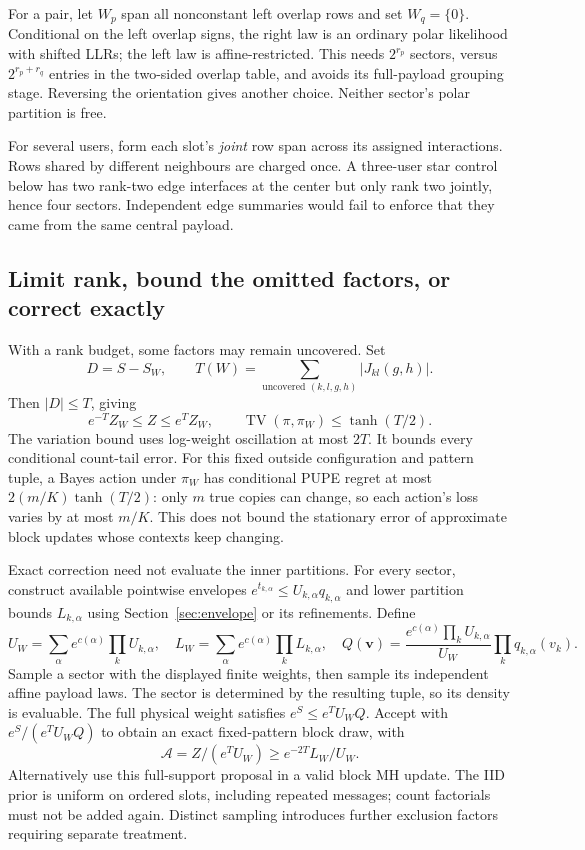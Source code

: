 \documentclass[10pt,a4paper]{article}
\newcommand{\TV}{\operatorname{TV}}
\begin{document}
For a pair, let $W_p$ span all nonconstant left overlap rows and set $W_q=\{0\}$. Conditional on the
left overlap signs, the right law is an ordinary polar likelihood with shifted LLRs; the left law
is affine-restricted. This needs $2^{r_p}$ sectors, versus $2^{r_p+r_q}$ entries in the two-sided
overlap table, and avoids its full-payload grouping stage. Reversing the orientation gives another
choice. Neither sector's polar partition is free.

For several users, form each slot's \emph{joint} row span across its assigned interactions.
Rows shared by different neighbours are charged once. A three-user star control below has two
rank-two edge interfaces at the center but only rank two jointly, hence four sectors. Independent
edge summaries would fail to enforce that they came from the same central payload.

\subsection{Limit rank, bound the omitted factors, or correct exactly}
With a rank budget, some factors may remain uncovered. Set
\[
 D=S-S_W,\qquad T(W)=\sum_{\text{uncovered }(k,l,g,h)}|J_{kl}(g,h)|.
\]
Then $|D|\leq T$, giving
\begin{equation}
 e^{-T}Z_W\leq Z\leq e^TZ_W,\qquad
 \TV(\pi,\pi_W)\leq\tanh(T/2).
 \label{eq:cover-error}
\end{equation}
The variation bound uses log-weight oscillation at most $2T$. It bounds every conditional count-tail
error. For this fixed outside configuration and pattern tuple, a Bayes action under $\pi_W$ has
conditional PUPE regret at most $2(m/K)\tanh(T/2)$: only $m$ true copies can change, so each action's
loss varies by at most $m/K$. This does not bound the stationary error of approximate block updates
whose contexts keep changing.

Exact correction need not evaluate the inner partitions. For every sector, construct available
pointwise envelopes $e^{t_{k,\alpha}}\leq U_{k,\alpha}q_{k,\alpha}$ and lower partition bounds
$L_{k,\alpha}$ using Section~\ref{sec:envelope} or its refinements. Define
\begin{equation}
 U_W=\sum_\alpha e^{c(\alpha)}\prod_kU_{k,\alpha},\quad
 L_W=\sum_\alpha e^{c(\alpha)}\prod_kL_{k,\alpha},\quad
 Q(\mathbf v)=\frac{e^{c(\alpha)}\prod_kU_{k,\alpha}}{U_W}
                         \prod_kq_{k,\alpha}(v_k).
 \label{eq:cover-proposal}
\end{equation}
Sample a sector with the displayed finite weights, then sample its independent affine payload laws.
The sector is determined by the resulting tuple, so its density is evaluable. The full physical
weight satisfies $e^S\leq e^TU_WQ$. Accept with $e^S/(e^TU_WQ)$ to obtain an exact fixed-pattern
block draw, with
\begin{equation}
 \mathcal A=Z/(e^TU_W)\geq e^{-2T}L_W/U_W.
 \label{eq:cover-accept}
\end{equation}
Alternatively use this full-support proposal in a valid block MH update. The IID prior is uniform
on ordered slots, including repeated messages; count factorials must not be added again. Distinct
sampling introduces further exclusion factors requiring separate treatment.
\end{document}
